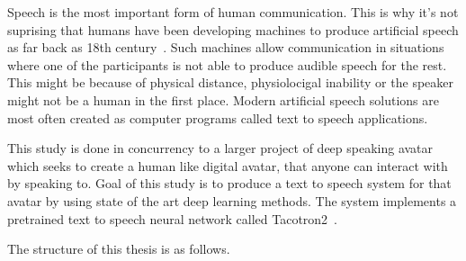Speech is the most important form of human communication. This is why it's not
suprising that humans have been developing machines to produce artificial speech
as far back as 18th century~\cite{SchroederManfredR1993Abho}. Such machines
allow communication in situations where one of the participants is not
able to produce audible speech for the rest. This might be because of physical
distance, physiolocigal inability or the speaker might not be a human in the
first place. Modern artificial speech solutions are most often created as
computer programs called text to speech applications. 



This study is done in concurrency to a larger project of
deep speaking avatar which seeks to create a human like digital avatar, that anyone
can interact with by speaking to. Goal of this study is to produce a
text to speech system for that avatar by using state of the art deep learning
methods. The system implements a pretrained text to speech neural network called
Tacotron2~\cite{shen2018natural}.

The structure of this thesis is as follows. 